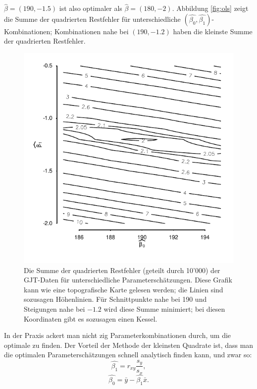 \documentclass[oneside, 10pt]{book}\usepackage[]{graphicx}\usepackage[]{xcolor}
\newenvironment{knitrout}{}{} %
\begin{document}
$\widehat{\beta} = (190, -1.5)$ ist also optimaler
als $\widehat{\beta} = (180, -2)$.
Abbildung \ref{fig:ols} zeigt die Summe der quadrierten Restfehler
für unterschiedliche  $(\widehat{\beta_0}, \widehat{\beta_1})$-Kombinationen;
Kombinationen nahe bei $(190, -1.2)$ haben die kleinste Summe der quadrierten Restfehler.

\begin{knitrout}
\color{fgcolor}\begin{figure}[t]

{\centering \includegraphics[width=.7\textwidth]{figs/unnamed-chunk-199-1} 

}

\caption{Die Summe der quadrierten Restfehler (geteilt durch 10'000) der GJT-Daten für unterschiedliche Parameterschätzungen. Diese Grafik kann wie eine topografische Karte gelesen werden; die Linien sind sozusagen Höhenlinien. Für Schnittpunkte nahe bei 190 und Steigungen nahe bei $-1.2$ wird diese Summe minimiert; bei diesen Koordinaten gibt es sozusagen einen Kessel.\label{fig:ols}}\label{fig:unnamed-chunk-199}
\end{figure}

\end{knitrout}

In der Praxis ackert man nicht zig Parameterkombinationen durch,
um die optimale zu finden. Der Vorteil der Methode der kleinsten
Quadrate ist, dass man die optimalen Parameterschätzungen schnell
analytisch finden kann, und zwar so:
\begin{equation*}
 \widehat{\beta_1} = r_{xy}\frac{s_y}{s_x},
\end{equation*}
\begin{equation}\label{eq:intercept}
 \widehat{\beta_0} = \bar{y} - \widehat{\beta_1} \bar{x}.
\end{equation}
\end{document}
